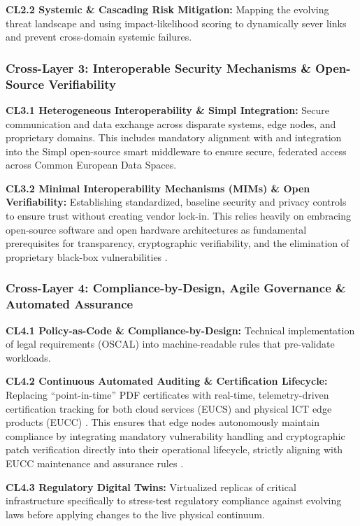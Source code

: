 \documentclass[12pt,a4paper]{article}
\begin{document}
\textbf{CL2.2 Systemic \& Cascading Risk Mitigation:} Mapping the evolving threat landscape and using impact-likelihood scoring to dynamically sever links and prevent cross-domain systemic failures.

\subsubsection*{Cross-Layer 3: Interoperable Security Mechanisms \& Open-Source Verifiability}
\textbf{CL3.1 Heterogeneous Interoperability \& Simpl Integration:} Secure communication and data exchange across disparate systems, edge nodes, and proprietary domains. This includes mandatory alignment with and integration into the Simpl open-source smart middleware \cite{cloud_edge_roadmap} to ensure secure, federated access across Common European Data Spaces.

\textbf{CL3.2 Minimal Interoperability Mechanisms (MIMs) \& Open Verifiability:} Establishing standardized, baseline security and privacy controls to ensure trust without creating vendor lock-in. This relies heavily on embracing open-source software and open hardware architectures as fundamental prerequisites for transparency, cryptographic verifiability, and the elimination of proprietary black-box vulnerabilities \cite{cloud_edge_roadmap}.

\subsubsection*{Cross-Layer 4: Compliance-by-Design, Agile Governance \& Automated Assurance}
\textbf{CL4.1 Policy-as-Code \& Compliance-by-Design:} Technical implementation of legal requirements (OSCAL) into machine-readable rules that pre-validate workloads.

\textbf{CL4.2 Continuous Automated Auditing \& Certification Lifecycle:} Replacing ``point-in-time'' PDF certificates with real-time, telemetry-driven certification tracking for both cloud services (EUCS) \cite{eucs} and physical ICT edge products (EUCC) \cite{eucc}. This ensures that edge nodes autonomously maintain compliance by integrating mandatory vulnerability handling and cryptographic patch verification directly into their operational lifecycle, strictly aligning with EUCC maintenance and assurance rules \cite{eucc}.

\textbf{CL4.3 Regulatory Digital Twins:} Virtualized replicas of critical infrastructure specifically to stress-test regulatory compliance against evolving laws before applying changes to the live physical continuum.
\end{document}
